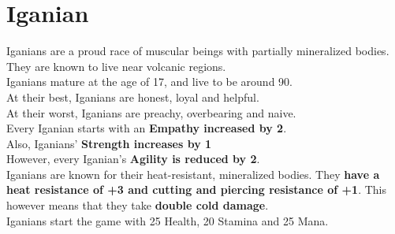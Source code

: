 \section{Iganian}
Iganians are a proud race of muscular beings with partially mineralized bodies. They are known to live near volcanic regions.\\
Iganians mature at the age of 17, and live to be around 90.\\
At their best, Iganians are honest, loyal and helpful.\\
At their worst, Iganians are preachy, overbearing and naive.\\
Every Iganian starts with an \textbf{Empathy increased by 2}.\\
Also, Iganians' \textbf{Strength increases by 1}\\
However, every Iganian's \textbf{Agility is reduced by 2}.\\
Iganians are known for their heat-resistant, mineralized bodies. They \textbf{have a heat resistance of +3 and cutting and piercing resistance of +1}. This however means that they take \textbf{double cold damage}.\\
Iganians start the game with 25 Health, 20 Stamina and 25 Mana.\\